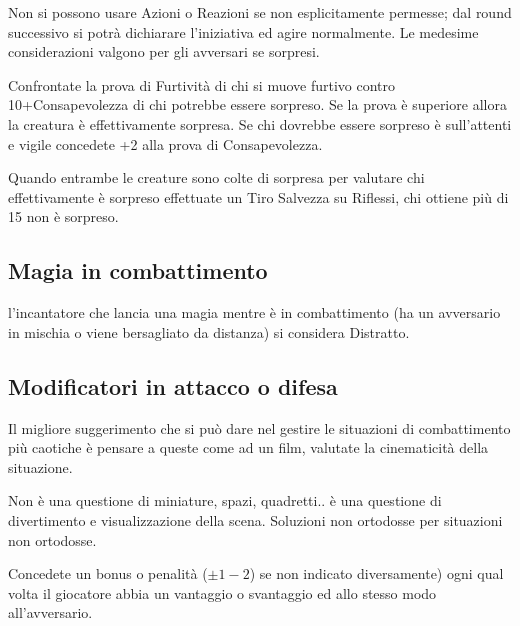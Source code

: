 \begin{multicols}{2}
Non si possono usare Azioni o Reazioni se non esplicitamente permesse; dal round successivo si potrà dichiarare l'iniziativa ed agire normalmente. Le medesime considerazioni valgono per gli avversari se sorpresi.

Confrontate la prova di Furtività di chi si muove furtivo contro 10+Consapevolezza di chi potrebbe essere sorpreso. Se la prova è superiore allora la creatura è effettivamente sorpresa. Se chi dovrebbe essere sorpreso è sull'attenti e vigile concedete +2 alla prova di Consapevolezza.

Quando entrambe le creature sono colte di sorpresa per valutare chi effettivamente è sorpreso effettuate un Tiro Salvezza su Riflessi, chi ottiene più di 15 non è sorpreso.

\subsection{Magia in combattimento}\label{magiaincombattimento}

l'incantatore che lancia una magia mentre è in combattimento (ha un avversario in mischia o viene bersagliato da distanza) si considera Distratto.

%

\subsection{Modificatori in attacco o difesa} \label{modificatoriattaccodifesaparticolari}

Il migliore suggerimento che si può dare nel gestire le situazioni di combattimento più caotiche è pensare a queste come ad un film, valutate la cinematicità della situazione.

Non è una questione di miniature, spazi, quadretti.. è una questione di divertimento e visualizzazione della scena. Soluzioni non ortodosse per situazioni non ortodosse.

Concedete un bonus o penalità ($\pm 1-2$) se non indicato diversamente) ogni qual volta il giocatore abbia un vantaggio o svantaggio ed allo stesso modo all'avversario.

\medskip

\end{multicols}

